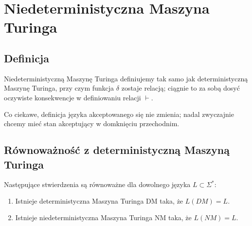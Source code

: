 \section{Niedeterministyczna Maszyna Turinga}

\subsection{Definicja}

\begin{definition}
	Niedeterministyczną Maszynę Turinga definiujemy tak samo jak deterministyczną Maszynę Turinga, przy czym funkcja \( \delta \) zostaje relacją; ciągnie to za sobą dosyć oczywiste konsekwencje w definiowaniu relacji \( \vdash\).

	Co ciekawe, definicja języka akceptowanego się nie zmienia; nadal zwyczajnie chcemy mieć stan akceptujący w domknięciu przechodnim.
\end{definition}

\subsection{Równoważność z deterministyczną Maszyną Turinga}

\begin{theorem}
	Następujące stwierdzenia są równoważne dla dowolnego języka \( L \subset \Sigma^*\):
	\begin{enumerate}
		\item Istnieje deterministyczna Maszyna Turinga DM taka, że \(L(DM) = L\).
		\item Istnieje niedeterministyczna Maszyna Turinga NM taka, że \(L(NM) = L \).
	\end{enumerate}
\end{theorem}

